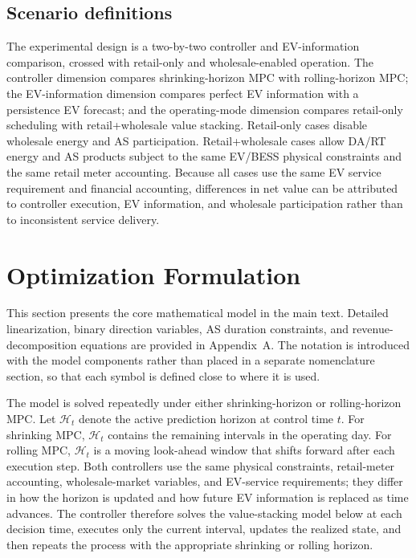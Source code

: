 \documentclass[final,5p,times]{elsarticle}
\newcommand{\calH}{\mathcal{H}}
\begin{document}
\subsection{Scenario definitions}
The experimental design is a two-by-two controller and EV-information comparison, crossed with retail-only and wholesale-enabled operation. The controller dimension compares shrinking-horizon MPC with rolling-horizon MPC; the EV-information dimension compares perfect EV information with a persistence EV forecast; and the operating-mode dimension compares retail-only scheduling with retail+wholesale value stacking. Retail-only cases disable wholesale energy and AS participation. Retail+wholesale cases allow DA/RT energy and AS products subject to the same EV/BESS physical constraints and the same retail meter accounting. Because all cases use the same EV service requirement and financial accounting, differences in net value can be attributed to controller execution, EV information, and wholesale participation rather than to inconsistent service delivery.
\section{Optimization Formulation}
This section presents the core mathematical model in the main text. Detailed linearization, binary direction variables, AS duration constraints, and revenue-decomposition equations are provided in Appendix~A. The notation is introduced with the model components rather than placed in a separate nomenclature section, so that each symbol is defined close to where it is used.

The model is solved repeatedly under either shrinking-horizon or rolling-horizon MPC. Let $\calH_t$ denote the active prediction horizon at control time $t$. For shrinking MPC, $\calH_t$ contains the remaining intervals in the operating day. For rolling MPC, $\calH_t$ is a moving look-ahead window that shifts forward after each execution step. Both controllers use the same physical constraints, retail-meter accounting, wholesale-market variables, and EV-service requirements; they differ in how the horizon is updated and how future EV information is replaced as time advances. The controller therefore solves the value-stacking model below at each decision time, executes only the current interval, updates the realized state, and then repeats the process with the appropriate shrinking or rolling horizon.
\end{document}

